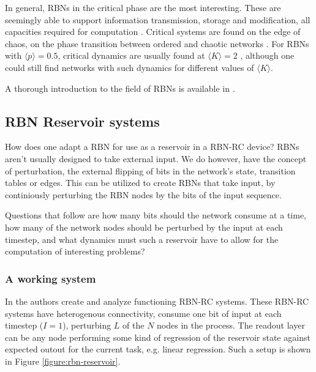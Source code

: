 In general, RBNs in the critical phase are the most interesting.
These are seemingly able to support information transmission, storage and modification,
all capacities required for computation \cite{langton3computation}.
Critical systems are found on the edge of chaos,
on the phase transition between ordered and chaotic networks \cite{gershenson2004introduction}.
For RBNs with $\langle p \rangle = 0.5$,
critical dynamics are usually found at $\langle K \rangle = 2$ \cite{gershenson2004introduction},
although one could still find networks with such dynamics for different values of $\langle K \rangle$.

A thorough introduction to the field of RBNs is available in \cite{gershenson2004introduction}.

\subsection{RBN Reservoir systems}
\label{subsection:rbn-reservoir-systems}

How does one adapt a RBN for use as a reservoir in a RBN-RC device?
RBNs aren't usually designed to take external input.
We do however, have the concept of perturbation,
the external flipping of bits in the network's state,
transition tables or edges.
This can be utilized to create RBNs that take input,
by continiously perturbing the RBN nodes by the bits of the input sequence.

Questions that follow are how many bits should the network consume at a time,
how many of the network nodes should be perturbed by the input at each timestep,
and what dynamics must such a reservoir have to allow for the computation of interesting problems?

\subsubsection{A working system}

In \cite{rbn-reservoir} the authors create and analyze functioning RBN-RC systems.
These RBN-RC systems have heterogenous connectivity,
consume one bit of input at each timestep ($I=1$),
perturbing $L$ of the $N$ nodes in the process.
The readout layer can be any node performing some kind of regression of the reservoir state against expected outout for the current task, e.g. linear regression.
Such a setup is shown in Figure \ref{figure:rbn-reservoir}.

